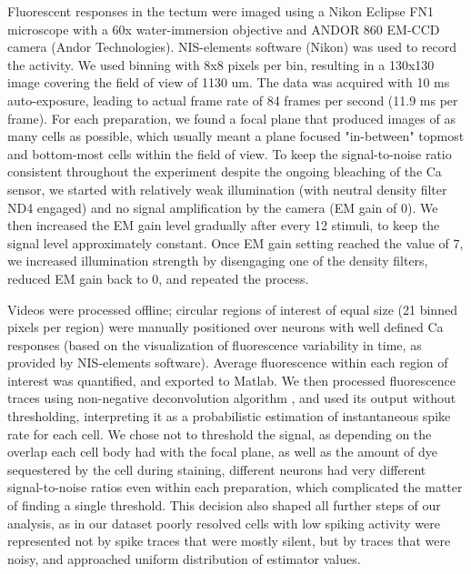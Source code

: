 \documentclass{article}
\begin{document}
Fluorescent responses in the tectum were imaged using a Nikon Eclipse FN1 microscope with a 60x water-immersion objective and ANDOR 860 EM-CCD camera (Andor Technologies). NIS-elements software (Nikon) was used to record the activity. We used binning with 8x8 pixels per bin, resulting in a 130x130 image covering the field of view of 1130 um. The data was acquired with 10 ms auto-exposure, leading to actual frame rate of 84 frames per second (11.9 ms per frame). For each preparation, we found a focal plane that produced images of as many cells as possible, which usually meant a plane focused "in-between" topmost and bottom-most cells within the field of view. To keep the signal-to-noise ratio consistent throughout the experiment despite the ongoing bleaching of the Ca sensor, we started with relatively weak illumination (with neutral density filter ND4 engaged) and no signal amplification by the camera (EM gain of 0). We then increased the EM gain level gradually after every 12 stimuli, to keep the signal level approximately constant. Once EM gain setting reached the value of 7, we increased illumination strength by disengaging one of the density filters, reduced EM gain back to 0, and repeated the process.

Videos were processed offline; circular regions of interest of equal size (21 binned pixels per region) were manually positioned over neurons with well defined Ca responses (based on the visualization of fluorescence variability in time, as provided by NIS-elements software). Average fluorescence within each region of interest was quantified, and exported to Matlab. We then processed fluorescence traces using non-negative deconvolution algorithm \citep{vogelstein2010oopsi}, and used its output without thresholding, interpreting it as a probabilistic estimation of instantaneous spike rate for each cell. We chose not to threshold the signal, as depending on the overlap each cell body had with the focal plane, as well as the amount of dye sequestered by the cell during staining, different neurons had very different signal-to-noise ratios even within each preparation, which complicated the matter of finding a single threshold. This decision also shaped all further steps of our analysis, as in our dataset poorly resolved cells with low spiking activity were represented not by spike traces that were mostly silent, but by traces that were noisy, and approached uniform distribution of estimator values. %
\end{document}
